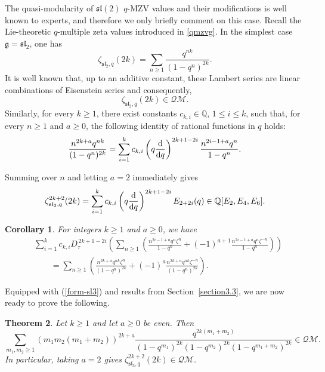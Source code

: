 \documentclass[10pt,a4paper]{amsart}
\numberwithin{equation}{section}
\newtheorem{Theorem}{Theorem}[section]
\newtheorem{Corollary}[Theorem]{Corollary}
\theoremstyle{definition}
\begin{document}
The quasi-modularity of $\mathfrak{sl}(2)$ $q$-MZV values and their modifications is well known to experts, and therefore we only briefly comment on this case.
Recall the Lie-theoretic $q$-multiple zeta values introduced in
\eqref{qmzvg}. In the simplest case $\mathfrak g=\mathfrak{sl}_2$, one has
\[
\zeta_{\mathfrak{sl}_2,q}(2k)
=
\sum_{n\ge1}\frac{q^{nk}}{(1-q^n)^{2k}}.
\]
It is well known that, up to an additive constant, these Lambert series are
linear combinations of Eisenstein series and consequently,
\[
\zeta_{\mathfrak{sl}_2,q}(2k)\in\mathcal{QM}.
\]
Similarly, for every $k\geq1$, there exist constants
$c_{k,i}\in\mathbb{Q}$, $1\leq i\leq k$, such that, for every
$n\geq1$ and $a\geq0$, the following identity of rational functions in $q$
holds:
\begin{equation}\label{lin-comb}
\frac{n^{2k+a}q^{nk}}{(1-q^n)^{2k}}
=
\sum_{i=1}^{k}
c_{k,i}
\left(q\frac{{\rm d}}{{\rm d}q}\right)^{2k+1-2i}
\frac{n^{2i-1+a}q^n}{1-q^n}.
\end{equation}

Summing over $n$ and letting $a=2$ immediately gives
\[
\zeta_{\mathfrak{sl}_2,q}^{2k+2}(2k)=\sum_{i=1}^{k} c_{k,i} \left(q \frac{{\rm d}}{{\rm d}q}\right)^{2k+1-2i} E_{2+2i}(q) \in \mathbb{Q}[E_2,E_4,E_6].
\]

\begin{Corollary}
For integers $k\geq1$ and $a\geq0$, we have
\begin{align}
&\sum_{i=1}^{k} c_{k,i}
D_\tau^{\,2k+1-2i}
\left(
\sum_{n\geq1}
\left(
\frac{n^{2i-1+a}q^n\zeta^n}{1-q^n}
+
(-1)^{a+1}
\frac{n^{2i-1+a}q^n\zeta^{-n}}{1-q^n}
\right)
\right)\nonumber
\\
&\qquad =
\sum_{n\geq1}
\left(
\frac{n^{2k+a}q^{nk}\zeta^n}{(1-q^n)^{2k}}
+
(-1)^a
\frac{n^{2k+a}q^{nk}\zeta^{-n}}{(1-q^n)^{2k}}
\right).\label{form-sl3}
\end{align}
\end{Corollary}
Equipped with (\ref{form-sl3}) and results from Section~\ref{section3.3}, we are now ready to prove the following.


\begin{Theorem} \label{sl3-qm} Let $k\geq1$ and let $a\geq0$ be even. Then
\[
\sum_{m_1,m_2\geq1}\left(m_1m_2(m_1+m_2)\right)^{2k+a}
\frac{q^{2k(m_1+m_2)}}{(1-q^{m_1})^{2k}(1-q^{m_2})^{2k}(1-q^{m_1+m_2})^{2k}}
\in\mathcal{QM}.
\]
In particular, taking $a=2$ gives $\zeta_{\mathfrak{sl}_3,q}^{2k+2}(2k)\in\mathcal{QM}$.
\end{Theorem}
\end{document}
